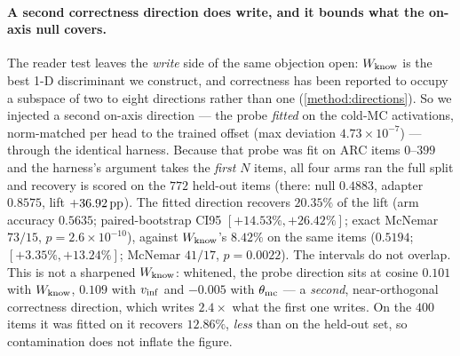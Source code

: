\paragraph{A second correctness direction does write, and it bounds what the
on-axis null covers.}
The reader test leaves the \emph{write} side of the same objection open: $W_{\mathrm{know}}$ is
the best 1-D discriminant we construct, and correctness has been reported to occupy a
subspace of two to eight directions rather than one (\cref{method:directions}). So we
injected a second on-axis direction --- the probe \emph{fitted} on the cold-MC
activations, norm-matched per head to the trained offset (max deviation
$4.73\times10^{-7}$) --- through the identical harness. Because that probe was fit on
ARC items $0$--$399$ and the harness's  argument takes the \emph{first}
$N$ items, all four arms ran the full split and recovery is scored on the $772$
held-out items (there: null $0.4883$, adapter $0.8575$, lift $+36.92\,\mathrm{pp}$). The fitted
direction recovers $\mathbf{20.35\%}$ of the lift (arm accuracy $0.5635$;
paired-bootstrap CI95 $[+14.53\%, +26.42\%]$; exact McNemar $73/15$,
$p = 2.6\times10^{-10}$), against $W_{\mathrm{know}}$'s $8.42\%$ on the same items ($0.5194$;
$[+3.35\%, +13.24\%]$; McNemar $41/17$, $p = 0.0022$). The intervals do not overlap.
This is not a sharpened $W_{\mathrm{know}}$: whitened, the probe direction sits at cosine
$0.101$ with $W_{\mathrm{know}}$, $0.109$ with $v_{\mathrm{inf}}$ and $-0.005$ with $\theta_{\mathrm{mc}}$ --- a
\emph{second}, near-orthogonal correctness direction, which writes $2.4\times$ what
the first one writes. On the $400$ items it was fitted on it recovers $12.86\%$,
\emph{less} than on the held-out set, so contamination does not inflate the figure.

